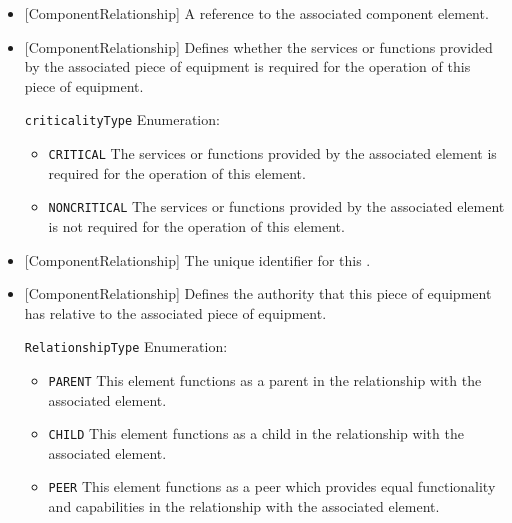 \begin{itemize}

\item {}[ComponentRelationship] \newline A reference to the associated component element.

\item {}[ComponentRelationship] \newline Defines whether the services or functions provided by the associated piece of equipment is required for the operation of this piece of equipment.

\texttt{criticalityType} Enumeration:

\begin{itemize}
\item \texttt{CRITICAL} \newline The services or functions provided by the associated element is required for the operation of this element. 
\item \texttt{NONCRITICAL} \newline The services or functions provided by the associated element is not required for the operation of this element. 
\end{itemize}


\item {}[ComponentRelationship] \newline The unique identifier for this .

\item {}[ComponentRelationship] \newline Defines the authority that this piece of equipment has relative to the associated piece of equipment.

\texttt{RelationshipType} Enumeration:

\begin{itemize}
\item \texttt{PARENT} \newline This element functions as a parent in the relationship with the associated element. 
\item \texttt{CHILD} \newline This element functions as a child in the relationship with the associated element. 
\item \texttt{PEER} \newline This element functions as a peer which provides equal functionality and capabilities in the relationship with the associated element. 
\end{itemize}

\end{itemize}


